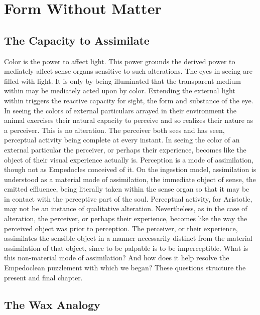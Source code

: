 \chapter{Form Without Matter} %
\label{cha:form_without_matter}

\section{The Capacity to Assimilate} %
\label{sec:the_capacity_to_assimilate}

Color is the power to affect light. This power grounds the derived power to mediately affect sense organs sensitive to such alterations. The eyes in seeing are filled with light. It is only by being illuminated that the transparent medium within may be mediately acted upon by color. Extending the external light within triggers the reactive capacity for sight, the form and substance of the eye. In seeing the colors of external particulars arrayed in their environment the animal exercises their natural capacity to perceive and so realizes their nature as a perceiver. This is no alteration. The perceiver both sees and has seen, perceptual activity being complete at every instant. In seeing the color of an external particular the perceiver, or perhaps their experience, becomes like the object of their visual experience actually is. Perception is a mode of assimilation, though not as Empedocles conceived of it. On the ingestion model, assimilation is understood as a material mode of assimilation, the immediate object of sense, the emitted effluence, being literally taken within the sense organ so that it may be in contact with the perceptive part of the soul. Perceptual activity, for Aristotle, may not be an instance of qualitative alteration. Nevertheless, as in the case of alteration, the perceiver, or perhaps their experience, becomes like the way the perceived object was prior to perception. The perceiver, or their experience, assimilates the sensible object in a manner necessarily distinct from the material assimilation of that object, since to be palpable is to be imperceptible. What is this non-material mode of assimilation? And how does it help resolve the Empedoclean puzzlement with which we began? These questions structure the present and final chapter. 


\section{The Wax Analogy} %
\label{sec:the_wax_analogy}

